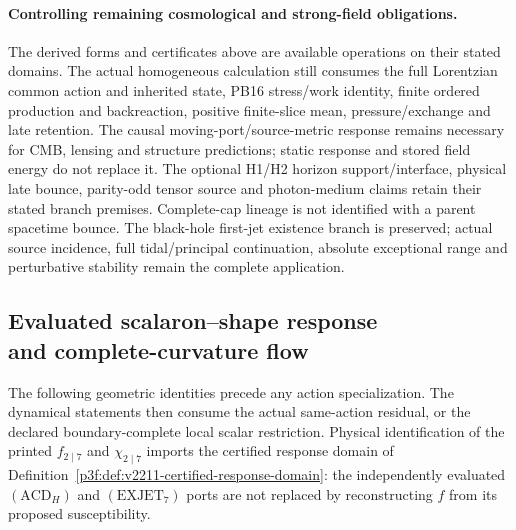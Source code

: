 \documentclass[12pt,a4paper]{article}
\begin{document}
\paragraph{Controlling remaining cosmological and strong-field obligations.}
The derived forms and certificates above are available operations on their
stated domains. The actual homogeneous calculation still consumes the full
Lorentzian common action and inherited state, PB16 stress/work identity,
finite ordered production and backreaction, positive finite-slice mean,
pressure/exchange and late retention. The causal moving-port/source-metric
response remains necessary for CMB, lensing and structure predictions;
static response and stored field energy do not replace it. The optional
H1/H2 horizon support/interface, physical late bounce, parity-odd tensor
source and photon-medium claims retain their stated branch premises.
Complete-cap lineage is not identified with a parent spacetime bounce.
The black-hole first-jet existence branch is preserved; actual source
incidence, full tidal/principal continuation, absolute exceptional range
and perturbative stability remain the complete application.

\subsection[Evaluated scalaron--shape response and complete-curvature flow]{Evaluated scalaron--shape response\\ and complete-curvature flow}
\label{p8:sec:v2212-scalaron-shape-flow}

The following geometric identities precede any action specialization.
The dynamical statements then consume the actual same-action residual,
or the declared boundary-complete local scalar restriction. Physical
identification of the printed $f_{2\mid7}$ and $\chi_{2\mid7}$ imports
the certified response domain of
Definition~\ref{p3f:def:v2211-certified-response-domain}: the independently
evaluated $(\mathrm{ACD}_H)$ and $(\mathrm{EXJET}_7)$ ports are not
replaced by reconstructing $f$ from its proposed susceptibility.
\end{document}

